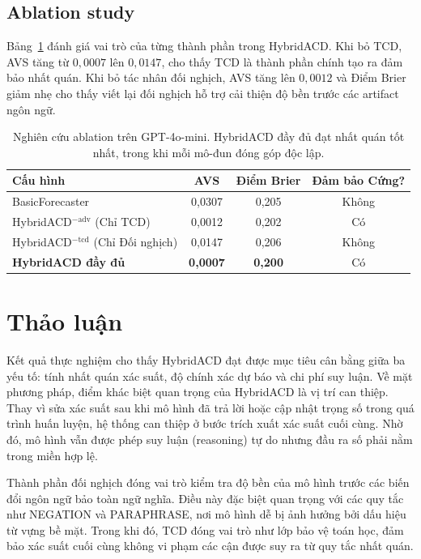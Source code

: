 \documentclass[pdflatex,sn-mathphys-num,oneside]{sn-jnl}
\begin{document}
\subsection{Ablation study}

Bảng~\ref{tab:ablation} đánh giá vai trò của từng thành phần trong HybridACD. Khi bỏ TCD, AVS tăng từ $0,0007$ lên $0,0147$, cho thấy TCD là thành phần chính tạo ra đảm bảo nhất quán. Khi bỏ tác nhân đối nghịch, AVS tăng lên $0,0012$ và Điểm Brier giảm nhẹ cho thấy viết lại đối nghịch hỗ trợ cải thiện độ bền trước các artifact ngôn ngữ.

\begin{table}[h]
\caption{Nghiên cứu ablation trên GPT-4o-mini. HybridACD đầy đủ đạt nhất quán tốt nhất,
  trong khi mỗi mô-đun đóng góp độc lập.}
\label{tab:ablation}
\begin{tabular}{@{}lccc@{}}
\toprule
Cấu hình & AVS & Điểm Brier & Đảm bảo Cứng? \\
\midrule
BasicForecaster                         & 0,0307 & 0,205 & Không \\
HybridACD$^{-\text{adv}}$ (Chỉ TCD)    & 0,0012 & 0,202 & Có \\
HybridACD$^{-\text{tcd}}$ (Chỉ Đối nghịch) & 0,0147 & 0,206 & Không \\
\textbf{HybridACD đầy đủ}               & \textbf{0,0007} & \textbf{0,200} & Có \\
\bottomrule
\end{tabular}
\end{table}

\section{Thảo luận}\label{sec:discussion}

Kết quả thực nghiệm cho thấy HybridACD đạt được mục tiêu cân bằng giữa ba yếu tố: tính nhất quán xác suất, độ chính xác dự báo và chi phí suy luận. Về mặt phương pháp, điểm khác biệt quan trọng của HybridACD là vị trí can thiệp. Thay vì sửa xác suất sau khi mô hình đã trả lời hoặc cập nhật trọng số trong quá trình huấn luyện, hệ thống can thiệp ở bước trích xuất xác suất cuối cùng. Nhờ đó, mô hình vẫn được phép suy luận (reasoning) tự do nhưng đầu ra số phải nằm trong miền hợp lệ.

Thành phần đối nghịch đóng vai trò kiểm tra độ bền của mô hình trước các biến đổi ngôn ngữ bảo toàn ngữ nghĩa. Điều này đặc biệt quan trọng với các quy tắc như NEGATION và PARAPHRASE, nơi mô hình dễ bị ảnh hưởng bởi dấu hiệu từ vựng bề mặt. Trong khi đó, TCD đóng vai trò như lớp bảo vệ toán học, đảm bảo xác suất cuối cùng không vi phạm các cận được suy ra từ quy tắc nhất quán.
\end{document}
